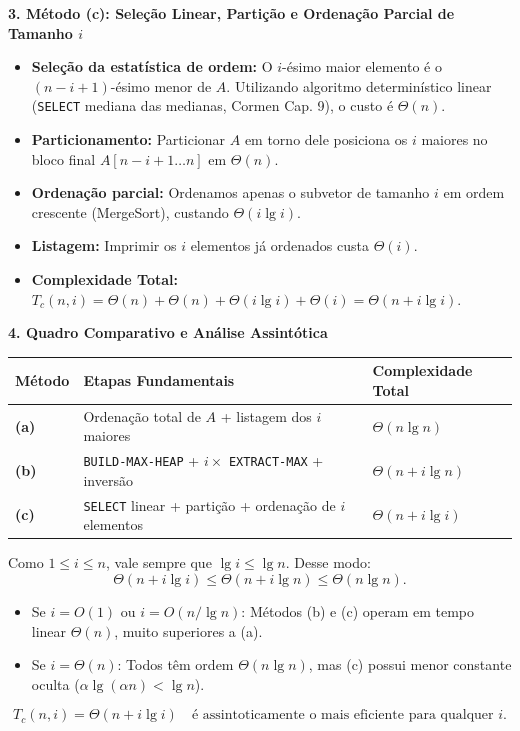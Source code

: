 \documentclass[10pt,a4paper]{article}
\newcommand{\resmath}[1]{\[\boxed{#1}\]}
\newcommand{\topico}[1]{\smallskip\noindent\textbf{\color{azul}#1}\par}
\begin{document}
\topico{3. Método (c): Seleção Linear, Partição e Ordenação Parcial de Tamanho $i$}
\begin{itemize}
    \setlength{\itemsep}{1pt}
    \item \textbf{Seleção da estatística de ordem:} O $i$-ésimo maior elemento é o $(n - i + 1)$-ésimo menor de $A$. Utilizando algoritmo determinístico linear (\texttt{SELECT} mediana das medianas, Cormen Cap. 9), o custo é $\Theta(n)$.
    \item \textbf{Particionamento:} Particionar $A$ em torno dele posiciona os $i$ maiores no bloco final $A[n - i + 1 \dots n]$ em $\Theta(n)$.
    \item \textbf{Ordenação parcial:} Ordenamos apenas o subvetor de tamanho $i$ em ordem crescente (MergeSort), custando $\Theta(i \lg i)$.
    \item \textbf{Listagem:} Imprimir os $i$ elementos já ordenados custa $\Theta(i)$.
    \item \textbf{Complexidade Total:} $T_c(n, i) = \Theta(n) + \Theta(n) + \Theta(i \lg i) + \Theta(i) = \Theta(n + i \lg i)$.
\end{itemize}

\topico{4. Quadro Comparativo e Análise Assintótica}
\begin{center}
\small
\setlength{\tabcolsep}{5pt}
\begin{tabular}{p{1.5cm}p{8.5cm}p{3.8cm}}
\toprule
\textbf{Método} & \textbf{Etapas Fundamentais} & \textbf{Complexidade Total} \\ \midrule
\textbf{(a)} & Ordenação total de $A$ + listagem dos $i$ maiores & $\Theta(n \lg n)$ \\
\textbf{(b)} & \texttt{BUILD-MAX-HEAP} + $i \times$ \texttt{EXTRACT-MAX} + inversão & $\Theta(n + i \lg n)$ \\
\textbf{(c)} & \texttt{SELECT} linear + partição + ordenação de $i$ elementos & $\Theta(n + i \lg i)$ \\
\bottomrule
\end{tabular}
\end{center}

Como $1 \le i \le n$, vale sempre que $\lg i \le \lg n$. Desse modo:
\[
\Theta(n + i \lg i) \le \Theta(n + i \lg n) \le \Theta(n \lg n).
\]
\begin{itemize}
    \setlength{\itemsep}{1pt}
    \item Se $i = O(1)$ ou $i = O(n/\lg n)$: Métodos (b) e (c) operam em tempo linear $\Theta(n)$, muito superiores a (a).
    \item Se $i = \Theta(n)$: Todos têm ordem $\Theta(n \lg n)$, mas (c) possui menor constante oculta ($\alpha \lg(\alpha n) < \lg n$).
\end{itemize}
\resmath{T_c(n, i) = \Theta(n + i \lg i) \quad \text{é assintoticamente o mais eficiente para qualquer } i.}
\end{document}
